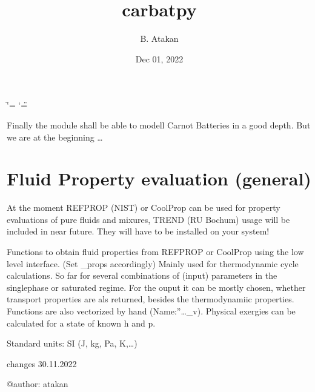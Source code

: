 \documentclass[letterpaper,10pt,english]{sphinxmanual}
\title{carbatpy}
\date{Dec 01, 2022}
\author{B.\@{} Atakan}
\begin{document}
\ifdefined\shorthandoff
  \ifnum\catcode`\=\string=\active\shorthandoff{=}\fi
  \ifnum\catcode`\"=\active{}\fi
\fi

\pagestyle{empty}
\sphinxmaketitle
\pagestyle{plain}
\sphinxtableofcontents
\pagestyle{normal}
\label{\detokenize{index::doc}}


\sphinxAtStartPar
Finally the module shall be able to modell Carnot Batteries in a
good depth. But we are at the beginning …

\sphinxstepscope


\chapter{Fluid Property evaluation (general)}
\label{\detokenize{fluid_properties_rp:fluid-property-evaluation-general}}\label{\detokenize{fluid_properties_rp::doc}}
\sphinxAtStartPar
At the moment REFPROP (NIST) or CoolProp can be used for property evaluations of
pure fluids and mixures, TREND (RU Bochum) usage  will be included in near future. They will have to be installed on your system!

\label{\detokenize{fluid_properties_rp:module-fluid_properties_rp}}
\sphinxAtStartPar
Functions to obtain fluid properties from REFPROP or CoolProp using the low
level interface. (Set \_props accordingly)
Mainly used for thermodynamic cycle calculations.
So far for several combinations of (input) parameters in the single\sphinxhyphen{}phase or
saturated regime. For the ouput it can be mostly chosen, whether transport
properties are als returned, besides the thermodynamiic properties.
Functions are also vectorized by hand (Name:”…\_v). Physical exergies can be calculated for a state of known h and p.

\sphinxAtStartPar
Standard units: SI (J, kg, Pa, K,…)

\sphinxAtStartPar
changes 30.11.2022

\sphinxAtStartPar
@author: atakan
\end{document}

